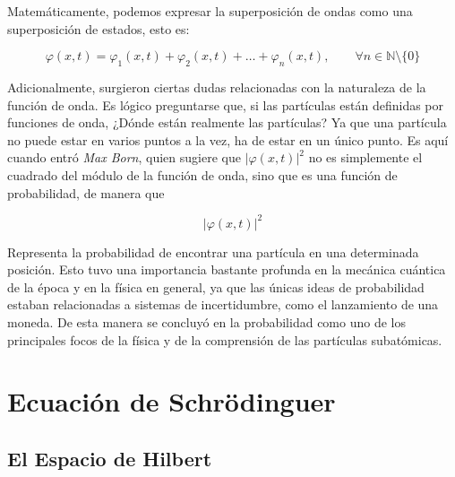 \documentclass{article}
\begin{document}
    \vspace{5mm}

    Matemáticamente, podemos expresar la superposición de ondas como una superposición de estados, esto es:

    \vspace{5mm}

    \begin{equation}
        \varphi(x, t) = \varphi_{1}(x, t) + \varphi_{2}(x, t) + \dots + \varphi_{n}(x, t), \qquad \forall n \in \mathbb{N} \setminus \{0\}
        \label{eq: superposicion}
    \end{equation}

    \vspace{5mm}

    Adicionalmente, surgieron ciertas dudas relacionadas con la naturaleza de la función de onda. Es lógico preguntarse que, si las partículas están definidas por funciones de onda, ¿Dónde están realmente las partículas? Ya que una partícula no puede estar en varios puntos a la vez, ha de estar en un único punto. Es aquí cuando entró \textit{Max Born}, quien sugiere que \( \lvert \varphi(x, t) \rvert ^ {2} \) no es simplemente el cuadrado del módulo de la función de onda, sino que es una función de probabilidad, de manera que 

    \vspace{5mm}

    \begin{equation}
        \lvert \varphi(x, t) \rvert ^ {2}
        \label{eq: probabilidad_onda}
    \end{equation}

    \vspace{5mm}

    Representa la probabilidad de encontrar una partícula en una determinada posición. Esto tuvo una importancia bastante profunda en la mecánica cuántica de la época y en la física en general, ya que las únicas ideas de probabilidad estaban relacionadas a sistemas de incertidumbre, como el lanzamiento de una moneda. De esta manera se concluyó en la probabilidad como uno de los principales focos de la física y de la comprensión de las partículas subatómicas.

    \vspace{5mm}

    \section{Ecuación de Schrödinguer}
    \subsection{El Espacio de Hilbert}
\end{document}
